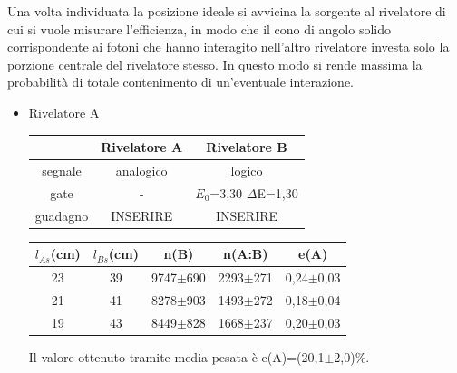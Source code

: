 \documentclass[italian,11pt]{report}
\begin{document}
Una volta individuata la posizione ideale si avvicina la sorgente al rivelatore di cui si vuole misurare l’efficienza, in modo che il cono di angolo solido corrispondente ai fotoni che hanno interagito nell’altro rivelatore investa solo la porzione centrale del rivelatore stesso. In questo modo si rende massima la probabilità di totale contenimento di un’eventuale interazione.
\begin{itemize}
    \item Rivelatore A 
    \begin{center}
    \centering
    \begin{tabular}{ccc}
    \hline
    & Rivelatore A& Rivelatore B\\
    \hline\hline
    segnale& analogico& logico\\
    gate& - & $E_{0}$=3,30  $\Delta$E=1,30\\
    guadagno& INSERIRE& INSERIRE\\
    \hline
    \end{tabular}
    \end{center}
    
    \vspace{0.3cm}
   \begin{center}
    \centering
    \begin{tabular}{ccccc}
    \hline
    $l_{As}$(cm)& $l_{Bs}$(cm)& n(B) &  n(A:B)& e(A)\\
    \hline\hline
    23& 39& 9747$\pm$690& 2293$\pm$271 & 0,24$\pm$0,03\\
    21& 41& 8278$\pm$903& 1493$\pm$272& 0,18$\pm$0,04\\
    19& 43& 8449$\pm$828& 1668$\pm$237& 0,20$\pm$0,03\\
    \hline
    \end{tabular}
    \end{center}
Il valore ottenuto tramite media pesata è e(A)=(20,1$\pm$2,0)$\%$.    
    
    \vspace{0.3cm}
    

\end{itemize}
\end{document}
